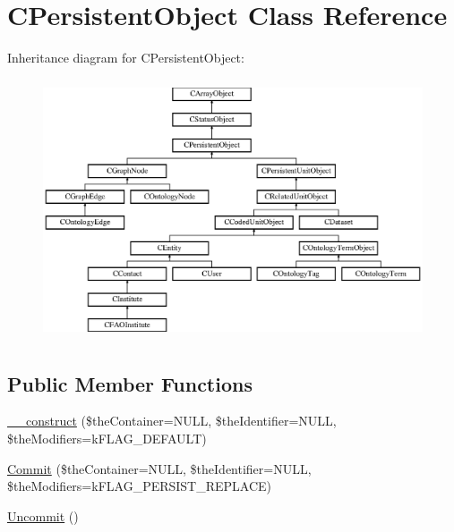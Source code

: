 \hypertarget{class_c_persistent_object}{\section{C\-Persistent\-Object Class Reference}
\label{class_c_persistent_object}
}
Inheritance diagram for C\-Persistent\-Object\-:\begin{figure}[H]
\begin{center}
\leavevmode
\includegraphics[height=7.724138cm]{class_c_persistent_object}
\end{center}
\end{figure}
\subsection*{Public Member Functions}
\begin{DoxyCompactItemize}
\item 
\hyperlink{class_c_persistent_object_a0f0729cfaef48bd1c98c0711c061a7d3}{\-\_\-\-\_\-construct} (\$the\-Container=N\-U\-L\-L, \$the\-Identifier=N\-U\-L\-L, \$the\-Modifiers=k\-F\-L\-A\-G\-\_\-\-D\-E\-F\-A\-U\-L\-T)
\item 
\hyperlink{class_c_persistent_object_a88b1f2b11d3d60e0b3d33d8b0649b68a}{Commit} (\$the\-Container=N\-U\-L\-L, \$the\-Identifier=N\-U\-L\-L, \$the\-Modifiers=k\-F\-L\-A\-G\-\_\-\-P\-E\-R\-S\-I\-S\-T\-\_\-\-R\-E\-P\-L\-A\-C\-E)
\item 
\hyperlink{class_c_persistent_object_a37c897b534e88477a06ec60b89d84450}{Uncommit} ()
\end{DoxyCompactItemize}
